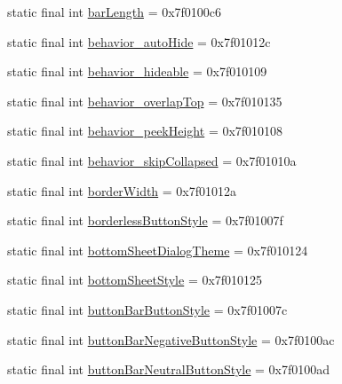 \begin{CompactItemize}
\item 
static final int \hyperlink{classandroid_1_1support_1_1graphics_1_1drawable_1_1_r_1_1attr_95df63afa5f70c05cff0de7cefdf6333}{barLength} = 0x7f0100c6
\item 
static final int \hyperlink{classandroid_1_1support_1_1graphics_1_1drawable_1_1_r_1_1attr_9729da2126b9076d2bb1fb0ed6c74ef9}{behavior\_\-autoHide} = 0x7f01012c
\item 
static final int \hyperlink{classandroid_1_1support_1_1graphics_1_1drawable_1_1_r_1_1attr_dd19ff80fc4acc7334410634ebe890d7}{behavior\_\-hideable} = 0x7f010109
\item 
static final int \hyperlink{classandroid_1_1support_1_1graphics_1_1drawable_1_1_r_1_1attr_11470ee017563d0e308ebcd0644d84c4}{behavior\_\-overlapTop} = 0x7f010135
\item 
static final int \hyperlink{classandroid_1_1support_1_1graphics_1_1drawable_1_1_r_1_1attr_71b202eec31b48b0c0eeda5bdcf08a75}{behavior\_\-peekHeight} = 0x7f010108
\item 
static final int \hyperlink{classandroid_1_1support_1_1graphics_1_1drawable_1_1_r_1_1attr_482863cc47c02c39246b2280b9616f77}{behavior\_\-skipCollapsed} = 0x7f01010a
\item 
static final int \hyperlink{classandroid_1_1support_1_1graphics_1_1drawable_1_1_r_1_1attr_40801de38e6454d51fb3d4ba534c8d9e}{borderWidth} = 0x7f01012a
\item 
static final int \hyperlink{classandroid_1_1support_1_1graphics_1_1drawable_1_1_r_1_1attr_2fea1c18ee2eb3df4572741f14c11b82}{borderlessButtonStyle} = 0x7f01007f
\item 
static final int \hyperlink{classandroid_1_1support_1_1graphics_1_1drawable_1_1_r_1_1attr_e8c2cdbd326f86c4b092ea82d6afe9c8}{bottomSheetDialogTheme} = 0x7f010124
\item 
static final int \hyperlink{classandroid_1_1support_1_1graphics_1_1drawable_1_1_r_1_1attr_ce10fc0d0990ed87f357957522f9b13e}{bottomSheetStyle} = 0x7f010125
\item 
static final int \hyperlink{classandroid_1_1support_1_1graphics_1_1drawable_1_1_r_1_1attr_59f3e94359324bea84cc9d5a2e432d22}{buttonBarButtonStyle} = 0x7f01007c
\item 
static final int \hyperlink{classandroid_1_1support_1_1graphics_1_1drawable_1_1_r_1_1attr_0c3b6b8d4b089c4dd8df5b10be0d7320}{buttonBarNegativeButtonStyle} = 0x7f0100ac
\item 
static final int \hyperlink{classandroid_1_1support_1_1graphics_1_1drawable_1_1_r_1_1attr_d54069c18638bb127fe203857fcbf324}{buttonBarNeutralButtonStyle} = 0x7f0100ad

\end{CompactItemize}
